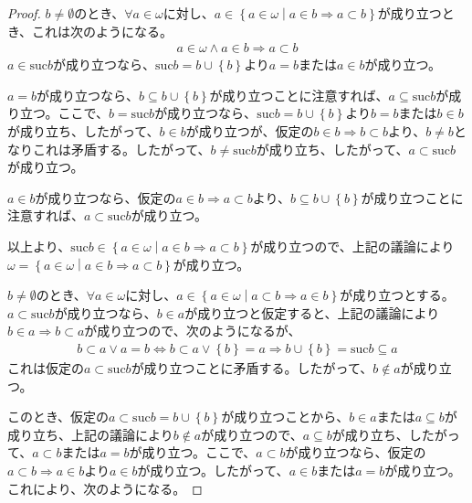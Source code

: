 \documentclass[dvipdfmx]{jsarticle}
\begin{document}
\begin{proof}
$b \neq \emptyset$のとき、$\forall a \in \omega$に対し、$a \in \left\{ a \in \omega \middle| a \in b \Rightarrow a \subset b \right\}$が成り立つとき、これは次のようになる。
\begin{align*}
a \in \omega \land a \in b \Rightarrow a \subset b
\end{align*}
$a \in {\mathrm{suc} }b$が成り立つなら、${\mathrm{suc} }b = b \cup \left\{ b \right\}$より$a = b$または$a \in b$が成り立つ。\par
$a = b$が成り立つなら、$b \subseteq b \cup \left\{ b \right\}$が成り立つことに注意すれば、$a \subseteq {\mathrm{suc} }b$が成り立つ。ここで、$b = {\mathrm{suc} }b$が成り立つなら、${\mathrm{suc} }b = b \cup \left\{ b \right\}$より$b = b$または$b \in b$が成り立ち、したがって、$b \in b$が成り立つが、仮定の$b \in b \Rightarrow b \subset b$より、$b \neq b$となりこれは矛盾する。したがって、$b \neq {\mathrm{suc} }b$が成り立ち、したがって、$a \subset {\mathrm{suc} }b$が成り立つ。\par
$a \in b$が成り立つなら、仮定の$a \in b \Rightarrow a \subset b$より、$b \subseteq b \cup \left\{ b \right\}$が成り立つことに注意すれば、$a \subset {\mathrm{suc} }b$が成り立つ。\par
以上より、${\mathrm{suc} }b \in \left\{ a \in \omega \middle| a \in b \Rightarrow a \subset b \right\}$が成り立つので、上記の議論により$\omega = \left\{ a \in \omega \middle| a \in b \Rightarrow a \subset b \right\}$が成り立つ。\par
$b \neq \emptyset$のとき、$\forall a \in \omega$に対し、$a \in \left\{ a \in \omega \middle| a \subset b \Rightarrow a \in b \right\}$が成り立つとする。$a \subset {\mathrm{suc} }b$が成り立つなら、$b \in a$が成り立つと仮定すると、上記の議論により$b \in a \Rightarrow b \subset a$が成り立つので、次のようになるが、
\begin{align*}
b \subset a \vee a = b \Leftrightarrow b \subset a \vee \left\{ b \right\} = a \Rightarrow b \cup \left\{ b \right\} = {\mathrm{suc} }b \subseteq a
\end{align*}
これは仮定の$a \subset {\mathrm{suc} }b$が成り立つことに矛盾する。したがって、$b \notin a$が成り立つ。\par
このとき、仮定の$a \subset {\mathrm{suc} }b = b \cup \left\{ b \right\}$が成り立つことから、$b \in a$または$a \subseteq b$が成り立ち、上記の議論により$b \notin a$が成り立つので、$a \subseteq b$が成り立ち、したがって、$a \subset b$または$a = b$が成り立つ。ここで、$a \subset b$が成り立つなら、仮定の$a \subset b \Rightarrow a \in b$より$a \in b$が成り立つ。したがって、$a \in b$または$a = b$が成り立つ。これにより、次のようになる。

\end{proof}
\end{document}
